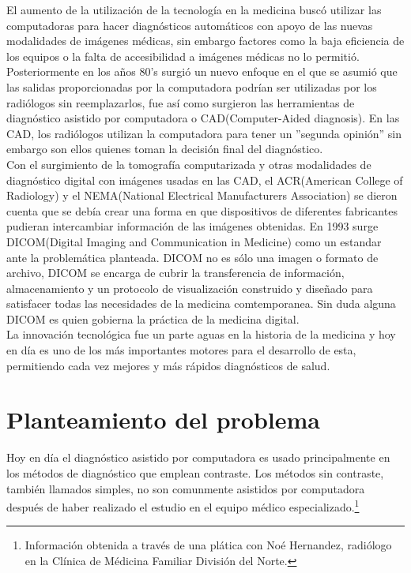 \documentclass[12pt]{report}
\begin{document}
El aumento de la utilización de la tecnología en la medicina buscó utilizar las computadoras para hacer diagnósticos automáticos con apoyo de las nuevas modalidades de imágenes médicas, sin embargo factores como la baja eficiencia de los equipos o la falta de accesibilidad a imágenes médicas no lo permitió. Posteriormente en los años 80's surgió un nuevo enfoque en el que se asumió que las salidas proporcionadas por la computadora podrían ser utilizadas por los radiólogos sin reemplazarlos, fue así como surgieron las herramientas de diagnóstico asistido por computadora o CAD(Computer-Aided diagnosis). En las CAD, los radiólogos utilizan la computadora para tener un ''segunda opinión'' sin embargo son ellos quienes toman la decisión final del diagnóstico.\cite{cad}\\

Con el surgimiento de la tomografía computarizada y otras modalidades de diagnóstico digital con imágenes usadas en las CAD, el ACR(American College of Radiology) y el NEMA(National Electrical Manufacturers Association) se dieron cuenta que se debía crear una forma en que dispositivos de diferentes fabricantes pudieran intercambiar información de las imágenes obtenidas. En 1993 surge DICOM(Digital Imaging and Communication in Medicine) como un estandar ante la problemática planteada.\cite{DICOMNEMA} DICOM no es sólo una imagen o formato de archivo, DICOM se encarga de cubrir la transferencia de información, almacenamiento y un protocolo de visualización construido y diseñado para satisfacer todas las necesidades de la medicina comtemporanea. Sin duda alguna DICOM es quien gobierna la práctica de la medicina digital.\cite{dicl}\\

La innovación tecnológica fue un parte aguas en la historia de la medicina y hoy en día es uno de los más importantes motores para el desarrollo de esta, permitiendo cada vez mejores y más rápidos diagnósticos de salud.

\section{Planteamiento del problema}
Hoy en día el diagnóstico asistido por computadora es usado principalmente en los métodos de diagnóstico que emplean contraste. Los métodos sin contraste, también llamados simples, no son comunmente asistidos por computadora después de haber realizado el estudio en el equipo médico especializado.\footnote{Información obtenida a través de una plática con Noé Hernandez, radiólogo en la Clínica de Médicina Familiar División del Norte.}\\
\end{document}
